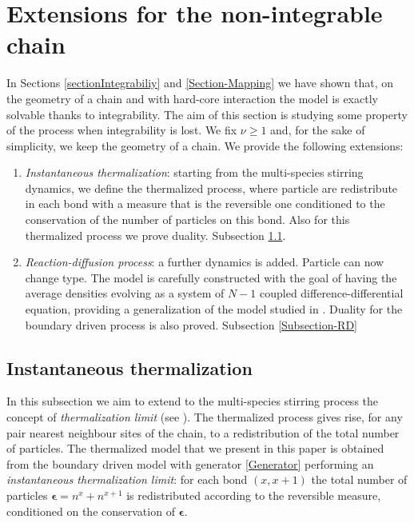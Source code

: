 \documentclass[10pt]{article}
\numberwithin{equation}{section}
\numberwithin{equation}{subsection}
\begin{document}
\section{Extensions for the non-integrable chain}
In Sections \ref{sectionIntegrabiliy} and \ref{Section-Mapping} we have shown that, on the geometry of a chain and with hard-core interaction the model is exactly solvable thanks to integrability.  
The aim of this section is studying some property of the process when integrability is lost. We fix $\nu\geq 1$ and, for the sake of simplicity, we keep the geometry of a chain. We provide the following extensions: 
\begin{enumerate}
	\item \textit{Instantaneous thermalization}: starting from the multi-species stirring dynamics, we define the thermalized process, where particle are redistribute in each bond with a measure that is the reversible one conditioned to the conservation of the number of particles on this bond. Also for this thermalized process we prove duality. Subsection \ref{Subsection-Thermalized}.
	\item \textit{Reaction-diffusion process}: a further dynamics is added. Particle can now change type. The model is carefully constructed with the goal of having the average densities evolving as a system of $N-1$ coupled difference-differential equation, providing a generalization of the model studied in \cite{casini2022uphill}. Duality for the boundary driven process is also proved. Subsection \ref{Subsection-RD}
\end{enumerate}


\subsection{Instantaneous thermalization}\label{Subsection-Thermalized}
In this subsection we aim to extend to the multi-species stirring process the concept of \textit{thermalization limit} (see \cite{carinci2013duality}). The thermalized process gives rise, for any pair nearest neighbour sites of the chain, to a redistribution of the total number of particles. The thermalized model that we present in this paper is obtained from the boundary driven model with generator \eqref{Generator} performing an \textit{instantaneous thermalization limit}: for each bond $(x,x+1)$ the total number of particles $\bm{\epsilon}=n^{x}+n^{x+1}$ is redistributed according to the reversible measure, conditioned on the conservation of $\bm{\epsilon}$. 
\end{document}
